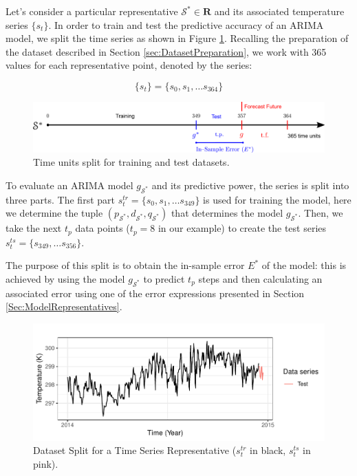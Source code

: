 Let's consider a particular representative $\mathcal{S}^{*} \in \mathbf{R}$ and its associated temperature series $\lbrace s_t \rbrace$. In order to train and test the predictive accuracy of an ARIMA model, we split the time series as shown in Figure \ref{Fig:TimeSplit}. Recalling the preparation of the dataset described in Section \ref{sec:DatasetPreparation}, we work with 365 values for each representative point, denoted by the series:

\begin{equation}
    \{s_{t} \} = \{s_{0}, s_{1}, \ldots s_{364} \}
\end{equation}

\begin{figure}[h!]
	\centering
	\includegraphics[scale=0.38]{../Figures/ModelRegion_ModelTS}
	\caption{Time units split for training and test datasets.}
	\label{Fig:TimeSplit}
\end{figure}

To evaluate an ARIMA model $g_{\mathcal{S}^{*}}$ and its predictive power, the series is split into three parts. The first part $s^{tr}_t = \lbrace s_0, s_1, \ldots s_{349} \rbrace$ is used for training the model, %
here we determine the tuple $(p_{\mathcal{S}^{*}}, d_{\mathcal{S}^{*}}, q_{\mathcal{S}^{*}})$ that determines the model $g_{\mathcal{S}^{*}}$. Then, we take the next $t_p$ data points ($t_p = 8$ in our example) to create the test series $s^{ts}_t = \lbrace s_{349}, \ldots s_{356} \rbrace$.

The purpose of this split is to obtain the in-sample error ${E^*}$ of the model: this is achieved by using the model $g_{\mathcal{S}^{*}}$ to predict $t_p$ steps and then calculating an associated error using one of the error expressions presented in Section \ref{Sec:ModelRepresentatives}.

\begin{figure}[h!]
	\centering
	\includegraphics[scale=1]{../Figures/medoid_test_training}
	\caption{Dataset Split for a Time Series Representative ($s^{tr}_t$ in black, $s^{ts}_t$ in pink).}
	\label{Fig:Time-SeriesSplit}
\end{figure}

